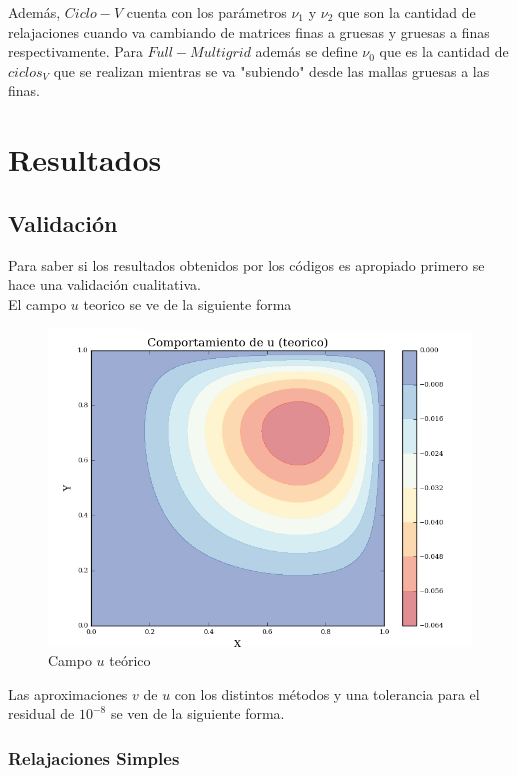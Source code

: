 \documentclass[letter,10pt]{article}
\begin{document}
Además, $Ciclo-V$ cuenta con los parámetros $\nu_1$ y $\nu_2$ que son la cantidad de relajaciones cuando va cambiando de matrices finas a gruesas y gruesas a finas respectivamente. Para $Full-Multigrid$ además se define $\nu_0$ que es la cantidad de $ciclos_V$ que se realizan mientras se va "subiendo" desde las mallas gruesas a las finas.

\section{Resultados}

\subsection{Validación}
Para saber si los resultados obtenidos por los códigos es apropiado primero se hace una validación cualitativa.\\

El campo $u$ teorico se ve de la siguiente forma

\begin{figure}[H]
\centering
\includegraphics[scale=0.6]{img/u_teorico}
\caption{Campo $u$ teórico}
\label{cualitteorico}
\end{figure}

Las aproximaciones $v$ de $u$ con los distintos métodos y una tolerancia para el residual de $10^{-8}$ se ven de la siguiente forma.

\subsubsection{Relajaciones Simples}
\end{document}
